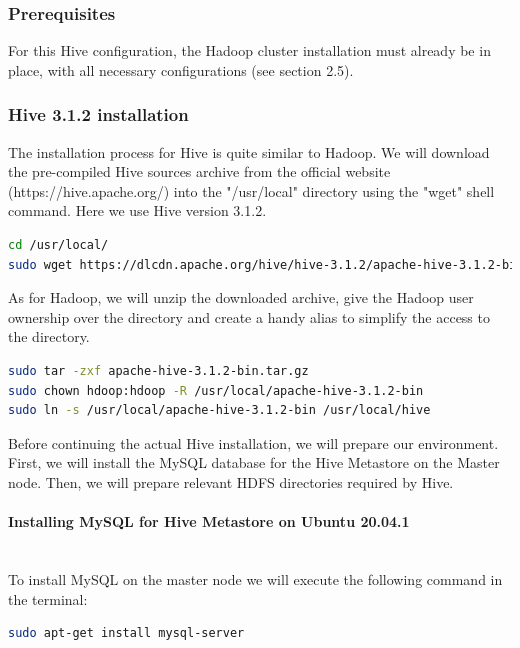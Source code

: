 \documentclass[12pt,english]{book}
\begin{document}
\subsubsection{Prerequisites}

For this Hive configuration, the Hadoop cluster installation must already be in place, with all necessary configurations (see section 2.5).

\subsubsection{Hive 3.1.2 installation}

The installation process for Hive is quite similar to Hadoop.
We will download the pre-compiled Hive sources archive from the official website (https://hive.apache.org/) into the "/usr/local" directory using the "wget" shell command.
Here we use Hive version 3.1.2.

\begin{lstlisting}[language=bash, frame=single, basicstyle=\footnotesize]
cd /usr/local/
sudo wget https://dlcdn.apache.org/hive/hive-3.1.2/apache-hive-3.1.2-bin.tar.gz
\end{lstlisting}

As for Hadoop, we will unzip the downloaded archive, give the Hadoop user ownership over the directory and create a handy alias to simplify the access to the directory.

\begin{lstlisting}[language=bash, frame=single, basicstyle=\footnotesize]
sudo tar -zxf apache-hive-3.1.2-bin.tar.gz
sudo chown hdoop:hdoop -R /usr/local/apache-hive-3.1.2-bin
sudo ln -s /usr/local/apache-hive-3.1.2-bin /usr/local/hive
\end{lstlisting}

Before continuing the actual Hive installation, we will prepare our environment.
First, we will install the MySQL database for the Hive Metastore on the Master node.
Then, we will prepare relevant HDFS directories required by Hive.

\paragraph{Installing MySQL for Hive Metastore on Ubuntu 20.04.1}\mbox{}\\

To install MySQL on the master node we will execute the following command in the terminal:

\begin{lstlisting}[language=bash, frame=single, basicstyle=\footnotesize]
sudo apt-get install mysql-server
\end{lstlisting}
\end{document}
